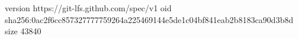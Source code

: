 version https://git-lfs.github.com/spec/v1
oid sha256:0ac2f6cc857327777759264a225469144e5de1c04bf841eab2b8183ca90d3b8d
size 43840
